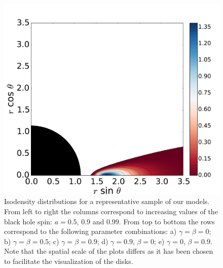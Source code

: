 \documentclass{aa}
\begin{document}
\begin{figure}
\includegraphics[scale=0.16]{figures/fig2_5_3.pdf}
\caption{Isodensity distributions for a representative sample of our models. From left to right the columns correspond to increasing values of the black hole spin: $a=0.5$, 0.9 and 0.99. From top to bottom the rows correspond to the following parameter combinations: a) $\gamma=\beta=0$; b) $\gamma=\beta=0.5$; c) $\gamma=\beta=0.9$; d) $\gamma=0.9$, $\beta=0$; e) $\gamma=0$, $\beta=0.9$. Note that the spatial scale of the plots differs as it has been chosen to facilitate the visualization of the disks.}
\label{models}
\end{figure}
\end{document}
